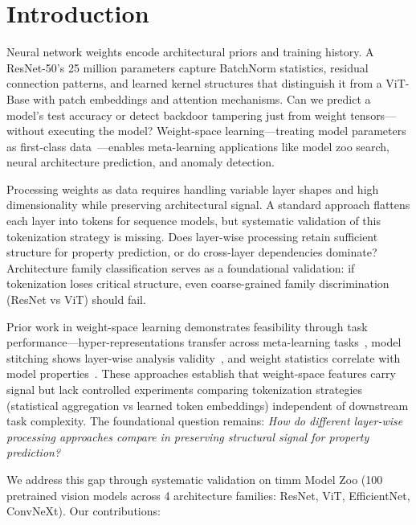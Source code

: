 \section{Introduction}

Neural network weights encode architectural priors and training history. A ResNet-50's 25 million parameters capture BatchNorm statistics, residual connection patterns, and learned kernel structures that distinguish it from a ViT-Base with patch embeddings and attention mechanisms. Can we predict a model's test accuracy or detect backdoor tampering just from weight tensors---without executing the model? Weight-space learning---treating model parameters as first-class data~\cite{schurholt2022hyper}---enables meta-learning applications like model zoo search, neural architecture prediction, and anomaly detection.

Processing weights as data requires handling variable layer shapes and high dimensionality while preserving architectural signal. A standard approach flattens each layer into tokens for sequence models, but systematic validation of this tokenization strategy is missing. Does layer-wise processing retain sufficient structure for property prediction, or do cross-layer dependencies dominate? Architecture family classification serves as a foundational validation: if tokenization loses critical structure, even coarse-grained family discrimination (ResNet vs ViT) should fail.

Prior work in weight-space learning demonstrates feasibility through task performance---hyper-representations transfer across meta-learning tasks~\cite{schurholt2022hyper}, model stitching shows layer-wise analysis validity~\cite{lenc2015understanding}, and weight statistics correlate with model properties~\cite{unterthiner2020predicting}. These approaches establish that weight-space features carry signal but lack controlled experiments comparing tokenization strategies (statistical aggregation vs learned token embeddings) independent of downstream task complexity. The foundational question remains: \textit{How do different layer-wise processing approaches compare in preserving structural signal for property prediction?}

We address this gap through systematic validation on timm Model Zoo (100 pretrained vision models across 4 architecture families: ResNet, ViT, EfficientNet, ConvNeXt). Our contributions:

